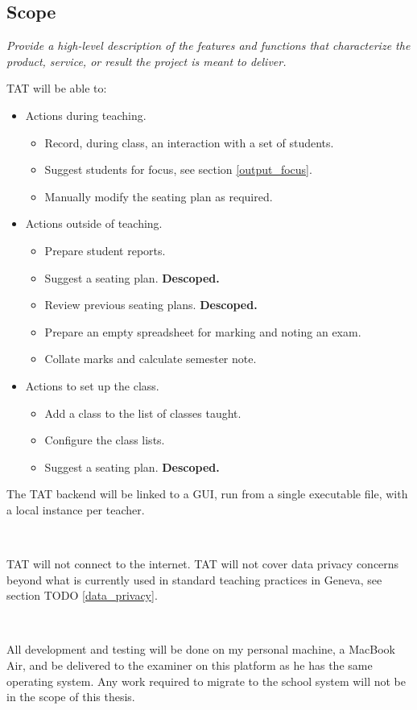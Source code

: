 \documentclass[10pt]{article}
\begin{document}
\subsection{Scope} 
\emph{Provide a high-level description of the features and functions that characterize the product, service, or result the project is meant to deliver.}

TAT will be able to:
\begin{itemize}
\item Actions during teaching.
\begin{itemize}
  \item Record, during class, an interaction with a set of students.
  \item Suggest students for focus, see section \ref{output_focus}.
  \item Manually modify the seating plan as required.
 \end{itemize}
 \item Actions outside of teaching.
 \begin{itemize}
  \item Prepare student reports.
  \item Suggest a seating plan. \textbf{Descoped.}
  \item Review previous seating plans.  \textbf{Descoped.}
  \item Prepare an empty spreadsheet for marking and noting an exam.
  \item Collate marks and calculate semester note.
\end{itemize}
\item Actions to set up the class.
\begin{itemize}
  \item Add a class to the list of classes taught.
  \item Configure the class lists.
  \item Suggest a seating plan.  \textbf{Descoped.}
\end{itemize}
\end{itemize}

The TAT backend will be linked to a GUI, run from a single executable file, with a local instance per teacher.

\

TAT will not connect to the internet. TAT will not cover data privacy concerns beyond what is currently used in standard teaching practices in Geneva, see section TODO \ref{data_privacy}.

\

All development and testing will be done on my personal machine, a MacBook Air, and be delivered to the examiner on this platform as he has the same operating system. Any work required to migrate to the school system will not be in the scope of this thesis.
\end{document}
